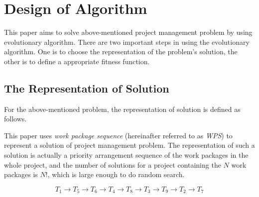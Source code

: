 %
%

\section{Design of Algorithm}
%
This paper aims to solve above-mentioned project management problem by using
evolutionary algorithm. There are two important steps in using the evolutionary
algorithm. One is to choose the representation of the problem's solution, the
other is to define a appropriate fitness function.




\subsection{The Representation of Solution}
%
For the above-mentioned problem, the representation of solution is defined as
follows.


This paper uses \emph{work package sequence} (hereinafter referred to as \emph{WPS}) to
represent a solution of project management problem. The representation of such a
solution is actually a priority arrangement sequence of the work packages in
the whole project, and the number of solutions for a project containing the $N$
work packages is $N!$, which is large enough to do random search.

\begin{equation}
  T_1 \rightarrow T_5 \rightarrow T_6 \rightarrow T_4 \rightarrow T_8
  \rightarrow T_3 \rightarrow T_9 \rightarrow T_2 \rightarrow T_7
  \label{repr}
\end{equation}

